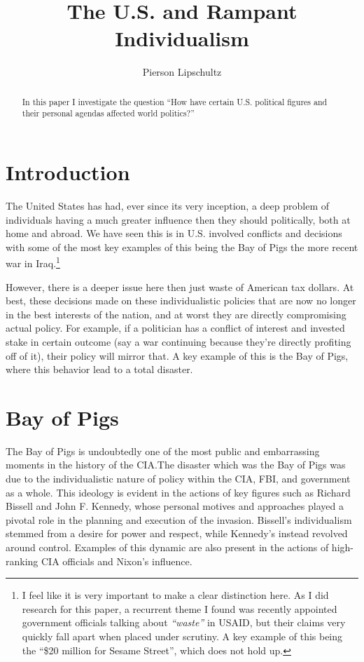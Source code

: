\documentclass[12pt]{article}
\title{The U.S. and Rampant Individualism }
\author{Pierson Lipschultz}
\begin{document}
\maketitle

\begin{abstract}
    In this paper I investigate the question ``How have certain U.S. political figures and their personal agendas affected world politics?''
\end{abstract}


\section{Introduction}

    The United States has had, ever since its very inception, a deep problem of individuals having a much greater influence then they should politically, both at home and abroad. We have seen this is in U.S. involved conflicts and decisions with some of the most key examples of this being the Bay of Pigs the more recent war in Iraq.\footnote{I feel like it is very important to make a clear distinction here. As I did research for this paper, a recurrent  theme I found was recently appointed government officials talking about \textit{``waste''} in USAID, but their claims very quickly fall apart when placed under scrutiny. A key example of this being the ``\$20 million for Sesame Street'', which does not hold up.} 

    However, there is a deeper issue here then just waste of American tax dollars. At best, these decisions made on these individualistic policies that are now no longer in the best interests of the nation, and at worst they are directly compromising actual policy. For example, if a politician has a conflict of interest and invested stake in certain outcome (say a war continuing because they're directly profiting off of it), their policy will mirror that. A key example of this is the Bay of Pigs, where this behavior lead to a total disaster.
    
\section{Bay of Pigs}

    The Bay of Pigs is undoubtedly one of the most public and embarrassing moments in the history of the CIA.\@ The disaster which was the Bay of Pigs was due to the individualistic nature of policy within the CIA, FBI, and government as a whole. This ideology is evident in the actions of key figures such as Richard Bissell and John F. Kennedy, whose personal motives and approaches played a pivotal role in the planning and execution of the invasion. Bissell's individualism stemmed from a desire for power and respect, while Kennedy's instead revolved around control. Examples of this dynamic are also present in the actions of high-ranking CIA officials and Nixon's influence.~\parencite{JeffreysJones2003}
\end{document}
